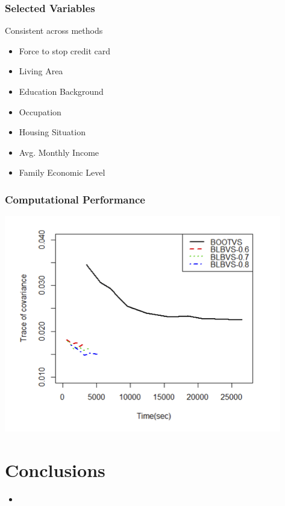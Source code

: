 \documentclass[11pt]{article}
\begin{document}
\subsubsection{Selected Variables}
\label{sec:org23d02f3}
Consistent across methods
\begin{itemize}
\item Force to stop credit card
\item Living Area
\item Education Background
\item Occupation
\item Housing Situation
\item Avg. Monthly Income
\item Family Economic Level
\end{itemize}
\subsubsection{Computational Performance}
\label{sec:orgaeb4c3d}

\begin{center}
\includegraphics[width=.9\linewidth]{./realresults.png}
\end{center}

\section{Conclusions}
\label{sec:orgf594eff}

\begin{itemize}
\item 
\end{itemize}
\end{document}
